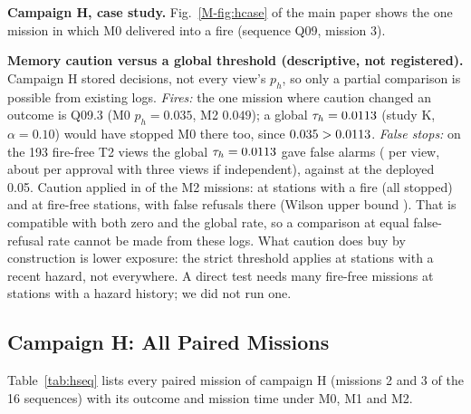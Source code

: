 \documentclass[conference]{IEEEtran}
\renewcommand{\thetable}{S\arabic{table}}
\begin{document}
\textbf{Campaign H, case study.} Fig.~\ref{M-fig:hcase} of the main paper shows the one mission in which M0 delivered into a fire (sequence Q09, mission 3).


\textbf{Memory caution versus a global threshold (descriptive, not registered).} Campaign H stored decisions, not every view's $p_h$, so only a partial comparison is possible
from existing logs. \emph{Fires:} the one mission where caution changed an outcome is Q09.3 (M0 $p_h=0.035$, M2 $0.049$); a global $\tau_h=0.0113$ (study K, $\alpha=0.10$) would have stopped M0 there too, since $0.035>0.0113$.
\emph{False stops:} on the 193 fire-free T2 views the global $\tau_h=0.0113$ gave \KFATen{} false alarms (\KFAViewTen{} per view, about \KFAMissionTen{} per approval with three views if independent), against \KFrozenFA{} at the deployed 0.05.
Caution applied in \HCautN{} of the \HPTwoN{} M2 missions: \HCautFire{} at stations with a fire (all \HCautStopped{} stopped) and \HCautFree{} at fire-free stations, with \HCautFalse{} false refusals there (Wilson upper bound \HCautFalseUpper).
That is compatible with both zero and the global rate, so a comparison at equal false-refusal rate cannot be made from these logs. What caution does buy by construction is lower exposure: the strict threshold applies at stations with a recent hazard, not everywhere.
A direct test needs many fire-free missions at stations with a hazard history; we did not run one.

\subsection{Campaign H: All Paired Missions}\label{sec:hseq}
Table~\ref{tab:hseq} lists every paired mission of campaign H (missions 2 and 3 of the 16 sequences) with its outcome and
mission time under M0, M1 and M2.
{\renewcommand{\thetable}{S8}%
\begin{table}[t]\centering\caption{Campaign H, all paired missions (Seq = sequence.mission). Outcome and mission time:
$\checkmark$ delivered, no unsafe delivery; $\times$ unsafe delivery; $\circ$ refused where no safe option existed; $\triangle$ refused
although a safe option existed (false refusal); no mission failed. Transition: what changed since the previous mission. Stories
(missions 1$\to$2$\to$3): S1 nominal, swapped, swapped; S2 swapped, swapped, nominal; S3 no fire, fire behind the requested station, fire;
S4 fire, no fire, fire. M2 source: first station taken from memory and/or caution applied to a station.}\label{tab:hseq}\scriptsize\resizebox{\linewidth}{!}{}\end{table}}
\addtocounter{table}{-1}
\end{document}
